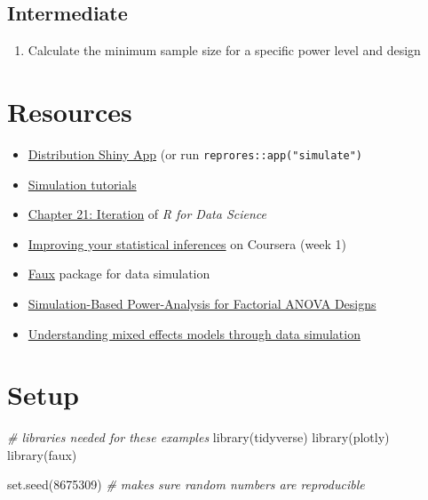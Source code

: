 \documentclass[
  oneside]{book}
\newenvironment{Shaded}{\begin{snugshade}}{\end{snugshade}}
\newcommand{\CommentTok}[1]{\textcolor[rgb]{0.56,0.35,0.01}{\textit{#1}}}
\newcommand{\DecValTok}[1]{\textcolor[rgb]{0.00,0.00,0.81}{#1}}
\newcommand{\FunctionTok}[1]{\textcolor[rgb]{0.00,0.00,0.00}{#1}}
\newcommand{\NormalTok}[1]{#1}
\providecommand{\tightlist}{%
  \setlength{\itemsep}{0pt}\setlength{\parskip}{0pt}}
\begin{document}
\hypertarget{intermediate-5}{%
\subsection{Intermediate}\label{intermediate-5}}

\begin{enumerate}
\def\labelenumi{\arabic{enumi}.}
\setcounter{enumi}{5}
\tightlist
\item
  Calculate the minimum sample size for a specific power level and design
\end{enumerate}

\hypertarget{resources8}{%
\section{Resources}\label{resources8}}

\begin{itemize}
\tightlist
\item
  \href{http://shiny.psy.gla.ac.uk/debruine/simulate/}{Distribution Shiny App} (or run \texttt{reprores::app("simulate")}
\item
  \href{https://debruine.github.io/tutorials/sim-data.html}{Simulation tutorials}
\item
  \href{http://r4ds.had.co.nz/iteration.html}{Chapter 21: Iteration} of \emph{R for Data Science}
\item
  \href{https://www.coursera.org/learn/statistical-inferences/}{Improving your statistical inferences} on Coursera (week 1)
\item
  \href{https://debruine.github.io/faux/}{Faux} package for data simulation
\item
  \href{https://psyarxiv.com/baxsf}{Simulation-Based Power-Analysis for Factorial ANOVA Designs} \citep{lakens_caldwell_2019}
\item
  \href{https://psyarxiv.com/xp5cy/}{Understanding mixed effects models through data simulation} \citep{debruine_barr_2019}
\end{itemize}

\hypertarget{setup8}{%
\section{Setup}\label{setup8}}

\begin{Shaded}
\begin{Highlighting}[]
\CommentTok{\# libraries needed for these examples}
\FunctionTok{library}\NormalTok{(tidyverse)}
\FunctionTok{library}\NormalTok{(plotly)}
\FunctionTok{library}\NormalTok{(faux)}

\FunctionTok{set.seed}\NormalTok{(}\DecValTok{8675309}\NormalTok{) }\CommentTok{\# makes sure random numbers are reproducible}
\end{Highlighting}
\end{Shaded}
\end{document}
